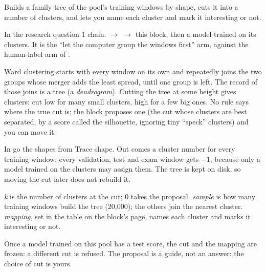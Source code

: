 Builds a family tree of the pool's training windows by shape, cuts it into a number of
clusters, and lets you name each cluster and mark it interesting or not.

In the research question 1 chain:  $\to$
 $\to$ this block, then a model trained on its clusters.
It is the ``let the computer group the windows first'' arm, against the human-label arm of
.

\begin{plainterms}
Ward clustering starts with every window on its own and repeatedly joins the two groups whose
merger adds the least spread, until one group is left. The record of those joins is a tree
(a \emph{dendrogram}). Cutting the tree at some height gives clusters: cut low for many small
clusters, high for a few big ones. No rule says where the true cut is; the block proposes one
(the cut whose clusters are best separated, by a score called the silhouette, ignoring tiny
``speck'' clusters) and you can move it.
\end{plainterms}

In go the shapes from Trace shape. Out comes a cluster number for every training window; every
validation, test and exam window gets $-1$, because only a model trained on the clusters may
assign them. The tree is kept on disk, so moving the cut later does not rebuild it.

\emph{k} is the number of clusters at the cut; 0 takes the proposal. \emph{sample} is how many
training windows build the tree (20,000); the others join the nearest cluster.
\emph{mapping}, set in the table on the block's page, names each cluster and marks it
interesting or not.

Once a model trained on this pool has a test score, the cut and the mapping are frozen: a
different cut is refused. The proposal is a guide, not an answer: the choice of cut is yours.
